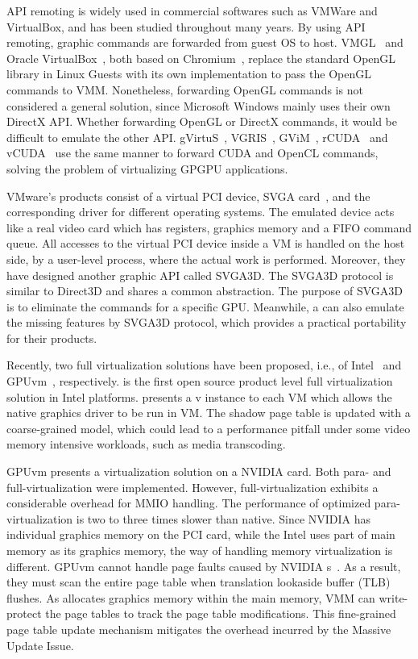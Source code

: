 API remoting is widely used in commercial softwares such as VMWare and VirtualBox, and has been studied throughout many years. By using API remoting, graphic commands are forwarded from guest OS to host. VMGL~{\cite{lagar2007vmm}} and Oracle VirtualBox~{\cite{website:vbox}}, both based on Chromium~{\cite{humphreys2002chromium}}, replace the standard OpenGL library in Linux Guests with its own implementation to pass the OpenGL commands to VMM. Nonetheless, forwarding OpenGL commands is not considered a general solution, since Microsoft Windows mainly uses their own DirectX API. Whether forwarding OpenGL or DirectX commands, it would be difficult to emulate the other API.
gVirtuS~{\cite{giunta2010gpgpu}}, VGRIS~{\cite{qi2014vgris}}, GViM~{\cite{gupta2009gvim}}, rCUDA~{\cite{duato2010rcuda}} and vCUDA~{\cite{shi2012vcuda}} use the same manner to forward CUDA and OpenCL commands, solving the problem of virtualizing GPGPU applications.

VMware's products consist of a virtual PCI device, SVGA  card~{\cite{dowty2009gpu}}, and the corresponding driver for different operating systems. The emulated device acts like a real video card which has registers, graphics memory and a FIFO command queue. All accesses to the virtual PCI device inside a VM is handled on the host side, by a user-level process, where the actual work is performed. Moreover, they have designed another graphic API called SVGA3D. The SVGA3D protocol is similar to Direct3D and shares a common abstraction. The purpose of SVGA3D is to eliminate the commands for a specific GPU. Meanwhile, a \gpu{} can also emulate the missing features by SVGA3D protocol, which provides a practical portability for their products.

Recently, two full \gpu{} virtualization solutions have been proposed, i.e., \gvirt{} of Intel~{\cite{tian2014full}} and GPUvm~{\cite{suzuki2014gpuvm}}, respectively. \gvirt{} is the first open source product level full \gpu{} virtualization solution in Intel platforms. \gvirt{} presents a v\gpu{} instance to each VM which allows the native graphics driver to be run in VM. The shadow page table is updated with a coarse-grained model, which could lead to a performance pitfall under some video memory intensive workloads, such as media transcoding.

GPUvm presents a \gpu{} virtualization solution on a NVIDIA card. Both para- and full-virtualization were implemented. However, full-virtualization exhibits a considerable overhead for MMIO handling. The performance of optimized para-virtualization is two to three times slower than native. Since NVIDIA has individual graphics memory on the PCI card, while the Intel \gpu{} uses part of main memory as its graphics memory, the way of handling memory virtualization is different. GPUvm cannot handle page faults caused by NVIDIA \gpu{}s~{\cite{gottschlag2013logv}}. As a result, they must scan the entire page table when translation lookaside buffer (TLB) flushes. As \name{} allocates graphics memory within the main memory, VMM can write-protect the page tables to track the page table modifications. This fine-grained page table update mechanism mitigates the overhead incurred by the Massive Update Issue.

